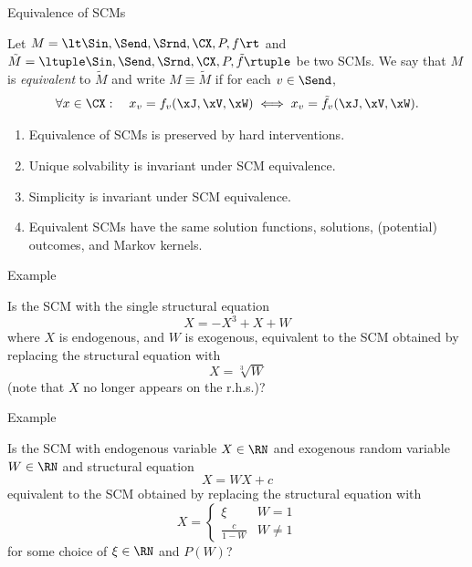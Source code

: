 \begin{frame}{Equivalence of SCMs}
  \begin{Def}[\ref{def:equivalent_scms}]
  Let $M = \lt \Sin, \Send, \Srnd, \CX, P, f \rt$ and
  $\tilde{M} = \ltuple \Sin, \Send, \Srnd, \CX, P, \tilde{f} \rtuple$ be two SCMs.
  We say that
  $M$ is \emph{equivalent} to $\tilde{M}$ and write $M \equiv \tilde{M}$ if for each $v \in \Send$,
  $$\forall x \in \CX: \quad x_v = f_v(\xJ,\xV,\xW) \iff x_v = \tilde{f}_v(\xJ,\xV,\xW).$$
\end{Def}
\begin{Prp}[\ref{prp:equivalent_scms}]
\begin{enumerate}
  \item Equivalence of SCMs is preserved by hard interventions.
  \item Unique solvability is invariant under SCM equivalence.
  \item Simplicity is invariant under SCM equivalence.
  \item Equivalent SCMs have the same solution functions, solutions, (potential) outcomes, and Markov kernels.
\end{enumerate}
\end{Prp}
\end{frame}

\begin{frame}{Example}
\begin{Eg}
  Is the SCM with the single structural equation
  $$X = -X^3 + X + W$$
  where $X$ is endogenous, and $W$ is exogenous, equivalent to the SCM obtained by replacing the structural equation with
  $$X = \sqrt[3]{W}$$
  (note that $X$ no longer appears on the r.h.s.)?

  \bigskip
\end{Eg}
\end{frame}

\begin{frame}{Example}
\begin{Eg}
  Is the SCM with endogenous variable $X \in \RN$ and exogenous random variable $W \in \RN$ and structural equation
  $$X = W X + c$$
  equivalent to the SCM obtained by replacing the structural equation with
  $$X = \begin{cases}
          \xi & W = 1 \\
          \frac{c}{1 - W} & W \ne 1
        \end{cases}$$
  for some choice of $\xi \in \RN$ and $P(W)$?

  \bigskip
\end{Eg}
\end{frame}

